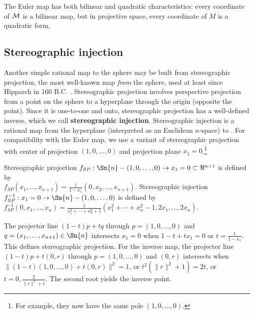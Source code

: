 \documentclass[12pt]{article}
\begin{document}
The Euler map has both bilinear and quadratic characteristics:
every coordinate of ${\cal M}$ is a bilinear map,
but in projective space, every coordinate of $M$ is a quadratic form.

\subsection{Stereographic injection}
\label{sec:sp}

Another simple rational map to the sphere may be built from stereographic projection,
the most well-known map {\em from} the sphere,
used at least since Hipparch in 160 B.C. \cite{kreyszig59}. %
Stereographic projection involves perspective projection from a point on the sphere 
to a hyperplane through the origin (opposite the point).
Since it is one-to-one and onto, stereographic projection has a well-defined inverse,
which we call {\bf stereographic injection}.
Stereographic injection is a rational map from the hyperplane %
(interpreted as an Euclidean $n$-space)
to .
%
%
For compatibility with the Euler map, 
we use a variant of stereographic projection with center of projection $(1,0,\ldots,0)$
and projection plane $x_1=0$.\footnote{For example, they now have the same pole $(1,0,\ldots,0)$.}


\begin{lemma}
\label{defn:si}
Stereographic projection 
$f_{SP}: \Sn{n} - (1,0,\ldots,0) \rightarrow x_1=0 \subset \Re^{n+1}$ 
is defined by\\
$f_{SP}(x_1,\ldots,x_{n+1}) = \frac{1}{1-x_1} (0,x_2,\ldots,x_{n+1})$.
Stereographic injection $f_{SP}^{-1}: x_1=0 \rightarrow \Sn{n} - (1,0,\ldots,0)$ 
is defined by
$f_{SP}^{-1}(0,x_1,\ldots,x_{n}) = \frac{1}{x_1^2 + \cdots + x_n^2 + 1} 
	(x_1^2 + \cdots + x_n^2 - 1, 2x_1, \ldots, 2x_n)$.
\end{lemma}
\vspace{.1in}
\prf
The projector line $(1-t)p + tq$ through $p = (1,0,\ldots,0)$ and 
$q = (x_1,\ldots,x_{n+1}) \in \Sn{n}$ intersects $x_1=0$ 
when $1-t + tx_1 = 0$ or $t = \frac{1}{1-x_1}$.
This defines stereographic projection.
For the inverse map, the projector line $(1-t)p + t(0,r)$ through $p = (1,0,\ldots,0)$ 
and $(0,r)$ intersects  when $\|(1-t)(1,0,\ldots,0) + t(0,r)\|^2 = 1$,
or $t^2(\|r\|^2 + 1) = 2t$, or 
$t=0,\frac{2}{\|r\|^2 + 1}$.
The second root yields the inverse point.
\QED
\end{document}
